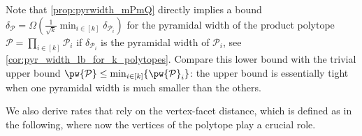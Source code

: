 \documentclass{article}
\newcommand{\R}{\mathbb{R}}
\newcommand{\bigomega}[1]{\Omega( #1 )}
\newcommand{\mP}{\mathcal{P}}
\DeclarePairedDelimiter\ceil{\lceil}{\rceil}
\DeclarePairedDelimiter\floor{\lfloor}{\rfloor}
\newcommand{\defi}{\stackrel{\mathrm{\scriptscriptstyle def}}{=}}
\newtheorem{remark}[theorem]{Remark}
\begin{document}
Note that \cref{prop:pyrwidth_mPmQ} directly implies a bound $\delta_\mathcal{P} = \bigomega{\frac{1}{\sqrt{k}}\min_{i\in[k]} \delta_{\mathcal{P}_i}}$ for the pyramidal width of the product polytope $\mathcal{P} = \prod_{i\in[k]} \mathcal{P}_i$ if $\delta_{\mathcal{P}_i}$ is the pyramidal width of $\mP_i$, see \cref{cor:pyr_width_lb_for_k_polytopes}. Compare this lower bound with the trivial upper bound $\pw{\mP} \leq \min_{i\in[k]}\{\pw{\mP}_i\}$: the upper bound is essentially tight when one pyramidal width is much smaller than the others.








We also derive rates that rely on the vertex-facet distance, which is defined as in the following, where now the vertices of the polytope play a crucial role.
\end{document}
